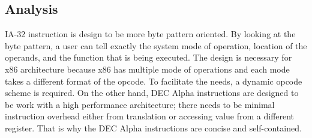 \documentclass[letterpaper,10pt,titlepage]{article}
\begin{document}

\subsection{Analysis}
IA-32 instruction is design to be more byte pattern oriented. 
By looking at the byte pattern, a user can tell exactly the system mode of operation,
location of the operands, and the function that is being executed. 
The design is necessary for x86 architecture because x86 has multiple mode of operations
and each mode takes a different format of the opcode. To facilitate the needs, a dynamic
opcode scheme is required. On the other hand, DEC Alpha instructions are designed to be
work with a high performance architecture; there needs to be minimal instruction overhead 
either from translation or accessing value from a different register. That is why the 
DEC Alpha instructions are concise and self-contained.





\newpage
\nocite{*}


\end{document}
